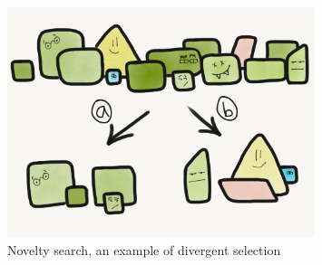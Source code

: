 \begin{figure}
  \includegraphics[width=0.8\textwidth]{img/novelty_search}
  \captionsetup{singlelinecheck=off,justification=raggedright}
  \caption[An Illustration of Novelty Search]{Novelty search, an example of divergent selection \cite{Wilder2015ReconcilingEvolvability}}
\end{figure}